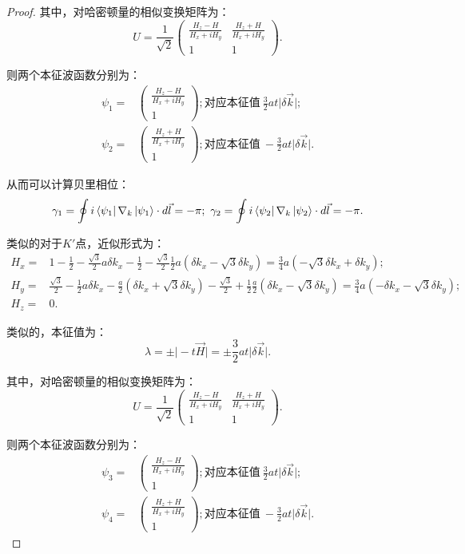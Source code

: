 \documentclass[reqno,a4paper,12pt]{amsart}
\begin{document}
\begin{proof}
其中，对哈密顿量的相似变换矩阵为：
\[
	U = \frac{1}{\sqrt{2}} \left( \begin{matrix}
		\frac{H_z - H}{H_x + iH_y} & \frac{H_z + H}{H_x + iH_y} \\
		1 & 1
	\end{matrix} \right).
\]

则两个本征波函数分别为：
\begin{align*}
	\psi_1 = & \left( \begin{matrix}
		\frac{H_z - H}{H_x + iH_y} \\
		1
	\end{matrix} \right); \text{对应本征值} \ \frac{3}{2}at\vert \delta \vec{k} \vert; \\
	\psi_2 = & \left( \begin{matrix}
		\frac{H_z + H}{H_x + iH_y} \\
		1
	\end{matrix} \right); \text{对应本征值} \ -\frac{3}{2}at\vert \delta \vec{k} \vert.
\end{align*}

从而可以计算贝里相位：
\[
	\gamma_1 = \oint i\bra{\psi_1} \nabla_k \ket{\psi_1} \cdot d\vec{l} = -\pi; \ \gamma_2 = \oint i\bra{\psi_2} \nabla_k \ket{\psi_2} \cdot d\vec{l} = -\pi.
\]

类似的对于$K'$点，近似形式为：
\begin{align*}
	H_x =& 1 - \frac{1}{2} - \frac{\sqrt{3}}{2}a\delta k_x - \frac{1}{2} - \frac{\sqrt{3}}{2}\frac{1}{2}a(\delta k_x-\sqrt{3}\delta k_y) = \frac{3}{4}a(-\sqrt{3}\delta k_x + \delta k_y); \\
	H_y =& \frac{\sqrt{3}}{2} - \frac{1}{2}a\delta k_x - \frac{a}{2}(\delta k_x+\sqrt{3}\delta k_y) - \frac{\sqrt{3}}{2} + \frac{1}{2}\frac{a}{2}(\delta k_x-\sqrt{3}\delta k_y) = \frac{3}{4}a(-\delta k_x - \sqrt{3}\delta k_y); \\
	H_z =& 0.
\end{align*}

类似的，本征值为：
\[
	\lambda = \pm \vert -t \vec{H} \vert = \pm \frac{3}{2}at\vert \delta \vec{k} \vert.
\]

其中，对哈密顿量的相似变换矩阵为：
\[
	U = \frac{1}{\sqrt{2}} \left( \begin{matrix}
		\frac{H_z - H}{H_x + iH_y} & \frac{H_z + H}{H_x + iH_y} \\
		1 & 1
	\end{matrix} \right).
\]

则两个本征波函数分别为：
\begin{align*}
	\psi_3 = & \left( \begin{matrix}
		\frac{H_z - H}{H_x + iH_y} \\
		1
	\end{matrix} \right); \text{对应本征值} \ \frac{3}{2}at\vert \delta \vec{k} \vert; \\
	\psi_4 = & \left( \begin{matrix}
		\frac{H_z + H}{H_x + iH_y} \\
		1
	\end{matrix} \right); \text{对应本征值} \ -\frac{3}{2}at\vert \delta \vec{k} \vert.
\end{align*}


\end{proof}
\end{document}
